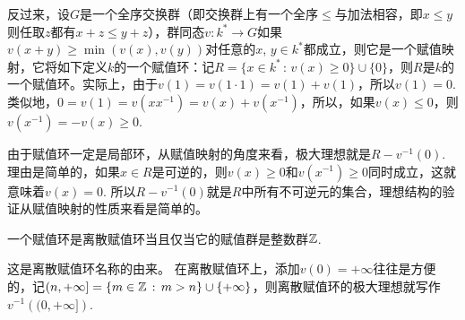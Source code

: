 \para 反过来，设$G$是一个全序交换群（即交换群上有一个全序$\leq$与加法相容，即$x\leq y$则任取$z$都有$x+z\leq y+z$），群同态$v:k^*\to G$如果$v(x+y)\geq \min\left(v(x),v(y)\right)$对任意的$x$, $y\in k^*$都成立，则它是一个赋值映射，它将如下定义$k$的一个赋值环：记$R=\{x\in k^* \,:\, v(x)\geq 0\}\cup \{0\}$，则$R$是$k$的一个赋值环。实际上，由于$v(1)=v(1\cdot 1)=v(1)+v(1)$，所以$v(1)=0$. 类似地，$0=v(1)=v(xx^{-1})=v(x)+v(x^{-1})$，所以，如果$v(x)\leq 0$，则$v(x^{-1})=-v(x)\geq 0$. 

由于赋值环一定是局部环，从赋值映射的角度来看，极大理想就是$R-v^{-1}(0)$. 理由是简单的，如果$x\in R$是可逆的，则$v(x)\geq 0$和$v(x^{-1})\geq 0$同时成立，这就意味着$v(x)=0$. 所以$R-v^{-1}(0)$就是$R$中所有不可逆元的集合，理想结构的验证从赋值映射的性质来看是简单的。

\begin{pro}
一个赋值环是离散赋值环当且仅当它的赋值群是整数群$\mathbb{Z}$. 
\end{pro}

这是离散赋值环名称的由来。
在离散赋值环上，添加$v(0)=+\infty$往往是方便的，记$(n,+\infty]=\{m\in \mathbb{Z}\,:\, m>n\}\cup \{+\infty\}$，则离散赋值环的极大理想就写作$v^{-1}\left((0,+\infty]\right)$. 

